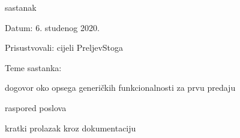 \begin{packed_enum}
			\item  sastanak
			\item[] \begin{packed_item}
				\item Datum: 6. studenog 2020.
				\item Prisustvovali: cijeli PreljevStoga
				\item Teme sastanka:
				\begin{packed_item}
					\item  dogovor oko opsega generičkih funkcionalnosti za prvu predaju
					\item  raspored poslova
					\item  kratki prolazak kroz dokumentaciju
				\end{packed_item}
			\end{packed_item}
			
			
		\end{packed_enum}
		
		\eject
